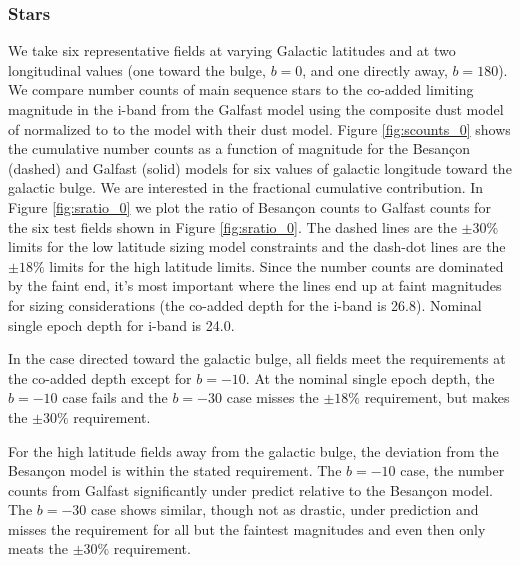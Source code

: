 \documentclass[]{article}
\begin{document}
{\subsubsection{Stars}
We take six representative fields at varying Galactic latitudes and at
two longitudinal values (one toward the bulge, $b=0$, and one directly
away, $b=180$).  We compare number counts of main sequence stars to
the co-added limiting magnitude in the i-band from the Galfast model
\citep{XXX} using the composite dust model of \citet{amores05}
normalized to \citet{schlegel98} to the \citet{besancon} model with
their dust model.  Figure \ref{fig:scounts_0} shows the cumulative
number counts as a function of magnitude for the Besan\c{c}on (dashed)
and Galfast (solid) models for six values of galactic longitude toward
the galactic bulge.  We are interested in the fractional cumulative
contribution.  In Figure \ref{fig:sratio_0} we plot the ratio of
Besan\c{c}on counts to Galfast counts for the six test fields shown in
Figure \ref{fig:sratio_0}.  The dashed lines are the $\pm30\%$ limits
for the low latitude sizing model constraints and the dash-dot lines
are the $\pm18\%$ limits for the high latitude limits.  Since the
number counts are dominated by the faint end, it's most important
where the lines end up at faint magnitudes for sizing considerations
(the co-added depth for the i-band is 26.8).  Nominal single epoch
depth for i-band is 24.0.

In the case directed toward the galactic bulge, all fields meet the requirements at the co-added depth except
for $b=-10$.  At the nominal single epoch depth, the $b=-10$ case fails and the $b=-30$ case misses the $\pm18\%$
requirement, but makes the $\pm30\%$ requirement.

For the high latitude fields away from the galactic bulge, the deviation from the Besan\c{c}on model is within 
the stated requirement.  The $b=-10$ case, the number counts from Galfast significantly under predict relative to 
the Besan\c{c}on model.  The $b=-30$ case shows similar, though not as drastic, under prediction and misses the 
requirement for all but the faintest magnitudes and even then only meats the $\pm30\%$ requirement.

}
\end{document}

